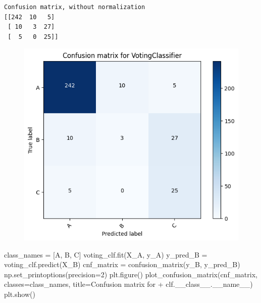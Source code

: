 \documentclass[
  letterpaper,
  DIV=11,
  numbers=noendperiod]{scrartcl}
\newenvironment{Shaded}{\begin{snugshade}}{\end{snugshade}}
\newcommand{\DecValTok}[1]{\textcolor[rgb]{0.68,0.00,0.00}{#1}}
\newcommand{\NormalTok}[1]{\textcolor[rgb]{0.00,0.23,0.31}{#1}}
\newcommand{\OperatorTok}[1]{\textcolor[rgb]{0.37,0.37,0.37}{#1}}
\newcommand{\StringTok}[1]{\textcolor[rgb]{0.13,0.47,0.30}{#1}}
\newcommand{\VariableTok}[1]{\textcolor[rgb]{0.07,0.07,0.07}{#1}}
\begin{document}
\begin{verbatim}
Confusion matrix, without normalization
[[242  10   5]
 [ 10   3  27]
 [  5   0  25]]
\end{verbatim}

\begin{figure}[H]

{\centering \includegraphics{transformer-paper4_files/figure-pdf/cell-13-output-8.png}

}

\end{figure}

\begin{Shaded}
\begin{Highlighting}[]
\NormalTok{class\_names }\OperatorTok{=}\NormalTok{ [}\StringTok{\textquotesingle{}A\textquotesingle{}}\NormalTok{, }\StringTok{\textquotesingle{}B\textquotesingle{}}\NormalTok{, }\StringTok{\textquotesingle{}C\textquotesingle{}}\NormalTok{]}
\NormalTok{voting\_clf.fit(X\_A, y\_A)}
\NormalTok{y\_pred\_B }\OperatorTok{=}\NormalTok{ voting\_clf.predict(X\_B)}
\NormalTok{cnf\_matrix }\OperatorTok{=}\NormalTok{ confusion\_matrix(y\_B, y\_pred\_B)}
\NormalTok{np.set\_printoptions(precision}\OperatorTok{=}\DecValTok{2}\NormalTok{)}
\NormalTok{plt.figure()}
\NormalTok{plot\_confusion\_matrix(cnf\_matrix, classes}\OperatorTok{=}\NormalTok{class\_names,}
\NormalTok{                      title}\OperatorTok{=}\StringTok{\textquotesingle{}Confusion matrix for \textquotesingle{}} \OperatorTok{+}\NormalTok{ clf.\_\_class\_\_.}\VariableTok{\_\_name\_\_}\NormalTok{)}
\NormalTok{plt.show()}
\end{Highlighting}
\end{Shaded}
\end{document}
